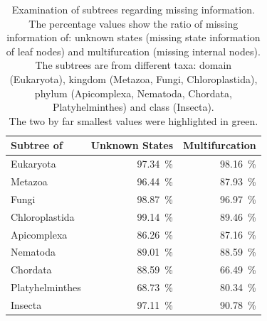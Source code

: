     \begin{table}[h!]
      \begin{center}
        \begin{tabular}{ |l||r|r| }
          \hline
          \bfseries Subtree of & \bfseries Unknown States & \bfseries Multifurcation \\ 
          \hline \hline
          Eukaryota       & 97.34~\%  & 98.16~\% \\
          \hline \hline
          Metazoa         & 96.44~\%  & 87.93~\% \\ \hline
          Fungi           & 98.87~\%  & 96.97~\% \\ \hline
          Chloroplastida  & 99.14~\%  & 89.46~\% \\
          \hline \hline            
          Apicomplexa     & 86.26~\%  & 87.16~\% \\ \hline
          Nematoda        & 89.01~\%  & 88.59~\% \\ \hline
          Chordata        & 88.59~\%  & \cellcolor{green!50}66.49~\% \\ \hline
          Platyhelminthes & \cellcolor{green!50}68.73~\%  & 80.34~\% \\
          \hline \hline            
          Insecta         & 97.11~\%  & 90.78~\% \\
          \hline  
        \end{tabular}
      \end{center}
      \caption{Examination of subtrees regarding missing information. \\ 
        The percentage values show the ratio of missing information of: unknown states (missing state 
          information of leaf nodes) and multifurcation (missing internal nodes). \\
        The subtrees are from different taxa: domain (Eukaryota), kingdom (Metazoa, Fungi, 
          Chloroplastida), phylum (Apicomplexa, Nematoda, Chordata, Platyhelminthes) and class 
          (Insecta). \\
        The two by far smallest values were highlighted in green.} 
      \label{table:percentage loss information subtrees} 
    \end{table}
    
